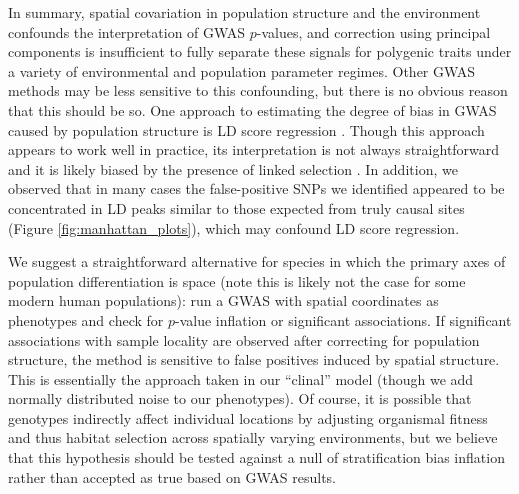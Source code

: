 \documentclass[10pt,twoside,lineno,hidelinks]{preprint}
\begin{document}
In summary, spatial covariation in population structure and the environment confounds the interpretation of GWAS $p$-values, and correction using principal components is insufficient to fully separate these signals for polygenic traits under a variety of environmental and population parameter regimes. 
Other GWAS methods may be less sensitive to this confounding, but there is no obvious reason that this should be so.
One approach to estimating the degree of bias in GWAS caused by population structure is LD score regression \citep{Bulik-Sullivan2015}. 
Though this approach appears to work well in practice, its interpretation is not always straightforward and it is likely biased by the presence of linked selection \citep{Berg2018}. In addition, we observed that in many cases the false-positive SNPs we identified appeared to be concentrated in LD peaks similar to those expected from truly causal sites (Figure \ref{fig:manhattan_plots}), which may confound LD score regression.

We suggest a straightforward alternative for species in which the primary axes of population differentiation is space 
(note this is likely not the case for some modern human populations): 
run a GWAS with spatial coordinates as phenotypes and check for $p$-value inflation or significant associations. 
If significant associations with sample locality are observed after correcting for population structure, 
the method is sensitive to false positives induced by spatial structure. 
This is essentially the approach taken in our ``clinal'' model (though we add normally distributed noise to our phenotypes). 
Of course, it is possible that genotypes indirectly affect individual locations by adjusting organismal fitness and thus habitat selection across spatially varying environments, but we believe that this hypothesis should be tested against a null of stratification bias inflation rather than accepted as true based on GWAS results.  

\end{document}
